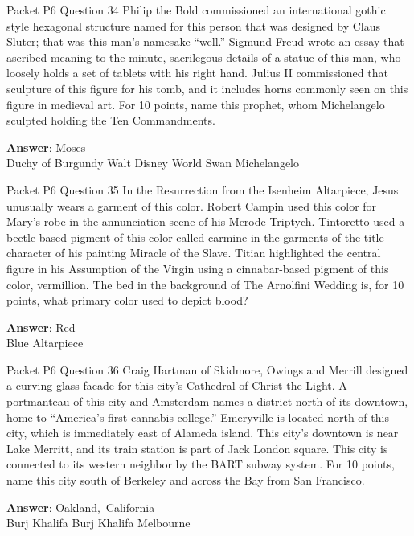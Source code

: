 \begin{frame}{Packet P6 Question 34}
Philip the Bold commissioned   an international gothic style hexagonal structure named for this person that   was designed by Claus Sluter; that was   this man's namesake ``well.'' Sigmund Freud wrote an essay that ascribed meaning to the minute, sacrilegous details of a statue of this man, who loosely holds a set of tablets with his right hand. Julius II commissioned that sculpture of this figure for his tomb, and it includes horns commonly seen on this figure in medieval art. For 10 points, name this prophet, whom Michelangelo sculpted holding the Ten Commandments.  

\textbf{Answer}: Moses\\
 Duchy of Burgundy
 Walt Disney World Swan
 Michelangelo
\end{frame}

\begin{frame}{Packet P6 Question 35}
In the Resurrection from the Isenheim Altarpiece, Jesus unusually wears a garment of this color. Robert     Campin used this color   for Mary’s robe   in the annunciation   scene of his Merode Triptych. Tintoretto used a beetle based pigment of this color called carmine in the garments of the title character of his painting Miracle of the Slave. Titian highlighted the central figure in his Assumption of the Virgin using a cinnabar-based pigment of this color, vermillion. The bed in the background of The Arnolfini Wedding is, for 10 points, what primary color used to depict blood?

\textbf{Answer}: Red\\
 Blue
 Altarpiece
\end{frame}

\begin{frame}{Packet P6 Question 36}
Craig Hartman of Skidmore, Owings and Merrill     designed a curving glass facade for this city’s Cathedral of Christ the Light. A portmanteau of this city and Amsterdam names a district north of its downtown, home to “America’s first cannabis college.” Emeryville is located north of this city, which is immediately east of Alameda island. This city’s downtown is near Lake Merritt, and   its train station is part of Jack London square. This city is connected to its western neighbor by the BART subway system. For 10 points, name this city south of Berkeley and across the Bay from San Francisco.  

\textbf{Answer}: Oakland,\ California\\
 Burj Khalifa
 Burj Khalifa
 Melbourne
\end{frame}

